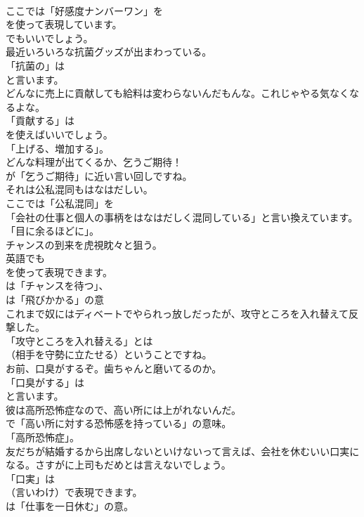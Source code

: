\documentclass[8pt]{extreport}
\begin{document}
\begin{CJK}{UTF8}{min}
\\	ここでは「好感度ナンバーワン」を 
\\	を使って表現しています。
\\	でもいいでしょう。	
\\	最近いろいろな抗菌グッズが出まわっている。 
\\	「抗菌の」は
\\	と言います。	
\\	どんなに売上に貢献しても給料は変わらないんだもんな。これじゃやる気なくなるよな。 
\\	「貢献する」は
\\	を使えばいいでしょう。
\\	「上げる、増加する」。	
\\	どんな料理が出てくるか、乞うご期待！ 
\\	が「乞うご期待」に近い言い回しですね。	
\\	それは公私混同もはなはだしい。 
\\	ここでは「公私混同」を
\\	「会社の仕事と個人の事柄をはなはだしく混同している」と言い換えています。
\\	「目に余るほどに」。	
\\	チャンスの到来を虎視眈々と狙う。 
\\	英語でも
\\	を使って表現できます。
\\	は「チャンスを待つ」、
\\	は「飛びかかる」の意	
\\	これまで奴にはディベートでやられっ放しだったが、攻守ところを入れ替えて反撃した。 
\\	「攻守ところを入れ替える」とは 
\\	（相手を守勢に立たせる）ということですね。	
\\	お前、口臭がするぞ。歯ちゃんと磨いてるのか。 
\\	「口臭がする」は
\\	と言います。	
\\	彼は高所恐怖症なので、高い所には上がれないんだ。 
\\	で「高い所に対する恐怖感を持っている」の意味。
\\	「高所恐怖症」。	
\\	友だちが結婚するから出席しないといけないって言えば、会社を休むいい口実になる。さすがに上司もだめとは言えないでしょう。 
\\	「口実」は
\\	（言いわけ）で表現できます。
\\	は「仕事を一日休む」の意。	

\end{CJK}
\end{document}
